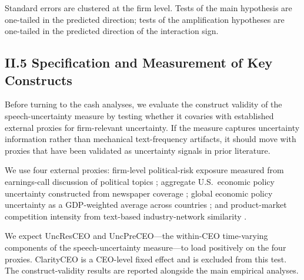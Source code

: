 Standard errors are clustered at the firm level. Tests of the main hypothesis are one-tailed in the predicted direction; tests of the amplification hypotheses are one-tailed in the predicted direction of the interaction sign.

\subsection*{II.5 Specification and Measurement of Key Constructs}
\label{sec:framework:constructs}

Before turning to the cash analyses, we evaluate the construct validity of the speech-uncertainty measure by testing whether it covaries with established external proxies for firm-relevant uncertainty. If the measure captures uncertainty information rather than mechanical text-frequency artifacts, it should move with proxies that have been validated as uncertainty signals in prior literature.

We use four external proxies: firm-level political-risk exposure measured from earnings-call discussion of political topics \cite{hassan2020}; aggregate U.S.\ economic policy uncertainty constructed from newspaper coverage \cite{baker2016}; global economic policy uncertainty as a GDP-weighted average across countries \cite{davis2016}; and product-market competition intensity from text-based industry-network similarity \cite{hoberg2016}.

We expect UncResCEO and UncPreCEO---the within-CEO time-varying components of the speech-uncertainty measure---to load positively on the four proxies. ClarityCEO is a CEO-level fixed effect and is excluded from this test. The construct-validity results are reported alongside the main empirical analyses.
